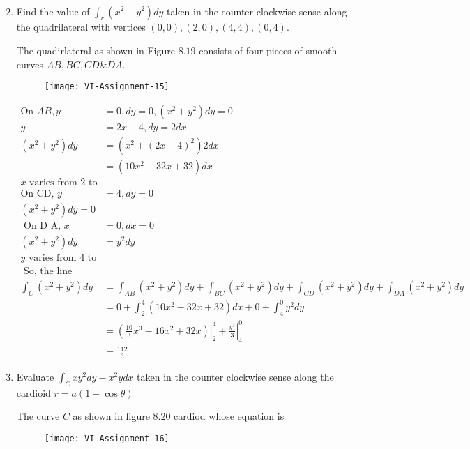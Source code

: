 \begin{enumerate}
\begin{answer}
\begin{align*}
	\end{align*}
\end{answer}
\item Find the value of $\int_{c}\left(x^{2}+y^{2}\right) d y$ taken in the counter clockwise sense along the quadrilateral with vertices $(0,0),(2,0),(4,4),(0,4)$.
\begin{answer}
	The quadirlateral as shown in Figure $8.19$ consists of four pieces of smooth curves $A B, B C, C D $\&$ D A$.
	\begin{figure}[H]
		\centering
		\texttt{[image: VI-Assignment-15]}
	\end{figure}
	\begin{align*}
	\text{On }A B, y&=0, d y=0,\left(x^{2}+y^{2}\right) d y=0\\
	 y &=2 x-4, d y=2 d x \\\left(x^{2}+y^{2}\right) d y &=\left(x^{2}+(2 x-4)^{2}\right) 2 d x \\ &=\left(10 x^{2}-32 x+32\right) d x \\
	 \text{$x$ varies from 2 to 4}\\
	 \text{On CD, }y&=4, d y=0\\
	 \left(x^{2}+y^{2}\right) d y=0\\
	 \text { On  D A, }x&=0, d x=0\\
	 \left(x^{2}+y^{2}\right) d y&=y^{2} d y\\
	 \text{$y$ varies from 4 to 0}\\
	\text{ So, the line integral}\\
	 \int_{C}\left(x^{2}+y^{2}\right) d y &=\int_{A B}\left(x^{2}+y^{2}\right) d y+\int_{B C}\left(x^{2}+y^{2}\right) d y+\int_{C D}\left(x^{2}+y^{2}\right) d y+\int_{D A}\left(x^{2}+y^{2}\right) d y \\ &=0+\int_{2}^{4}\left(10 x^{2}-32 x+32\right) d x+0+\int_{4}^{0} y^{2} d y \\ &=\left.\left(\frac{10}{3} x^{3}-16 x^{2}+32 x\right)\right|_{2} ^{4}+\left.\frac{y^{3}}{3}\right|_{4} ^{0} \\ &=\frac{112}{3} 
	\end{align*}
\end{answer}
\item  Evaluate $\int_{C} x y^{2} d y-x^{2} y d x$ taken in the counter clockwise sense along the cardioid $r=a(1+\cos \theta)$
\begin{answer}
	The curve $C$ as shown in figure $8.20$ cardiod whose equation is
	\begin{figure}[H]
		\centering
		\texttt{[image: VI-Assignment-16]}

\end{figure}
\end{answer}
\end{enumerate}
